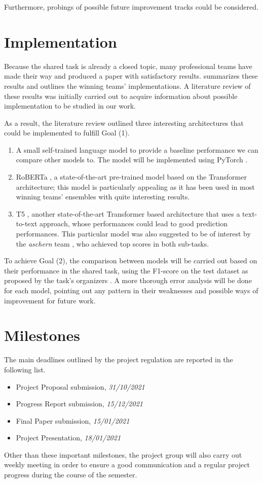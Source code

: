 \documentclass[11pt]{article}
\begin{document}
\noindent
Furthermore, probings of possible future improvement tracks could be considered.

\section{Implementation}
Because the shared task is already a closed topic, many professional teams have made their way and produced a paper with satisfactory results. \citet{semeval} summarizes these results and outlines the winning teams' implementations. A literature review of these results was initially carried out to acquire information about possible implementation to be studied in our work.

As a result, the literature review outlined three interesting architectures that could be implemented to fulfill Goal (1).
\begin{enumerate}
        \item A small self-trained language model to provide a baseline performance we can compare other models to. The model will be implemented using PyTorch \cite{NEURIPS2019_9015}.
        \item RoBERTa \cite{roberta}, a state-of-the-art pre-trained model based on the Transformer architecture; this model is particularly appealing as it has been used in most winning teams' ensembles \cite{aschern, morio-etal-2020-hitachi-semeval} with quite interesting results.
        \item T5 \cite{2020t5}, another state-of-the-art Transformer based architecture that uses a text-to-text approach, whose performances could lead to good prediction performances. This particular model was also suggested to be of interest by the \textit{aschern} team \cite{aschern}, who achieved top scores in both sub-tasks.
    \end{enumerate}

To achieve Goal (2), the comparison between models will be carried out based on their performance in the shared task, using the F1-score on the test dataset as proposed by the task's organizers \cite{semeval}. A more thorough error analysis will be done for each model, pointing out any pattern in their weaknesses and possible ways of improvement for future work.

\section{Milestones}
The main deadlines outlined by the project regulation are reported in the following list. 
\begin{itemize}
    \item Project Proposal submission, \textit{31/10/2021}
    \item Progress Report submission, \textit{15/12/2021}
    \item Final Paper submission, \textit{15/01/2021}
    \item Project Presentation, \textit{18/01/2021}
\end{itemize}
Other than these important milestones, the project group will also carry out weekly meeting in order to ensure a good communication and a regular project progress during the course of the semester. 
\end{document}
